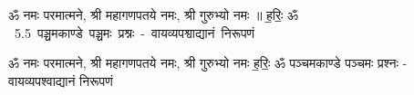 \documentclass[17pt]{extarticle}
\begin{document}
\begin{titlepage}
    \begin{center}
 
\begin{sanskrit}
    { \Large
    ॐ नमः परमात्मने, श्री महागणपतये नमः, श्री गुरुभ्यो नमः ॥ ह॒रिः॒ ॐ 
    }
    \\
    \vspace{2.5cm}
    \mbox{ \Huge
    5.5      पञ्चमकाण्डे पञ्चमः प्रश्नः - वायव्यपश्वाद्यानं निरूपणं   }
\end{sanskrit}
\end{center}

\end{titlepage}
\tableofcontents

ॐ नमः परमात्मने, श्री महागणपतये नमः, श्री गुरुभ्यो नमः
ह॒रिः॒ ॐ       पञ्चमकाण्डे पञ्चमः प्रश्नः - वायव्यपश्वाद्यानं निरूपणं \newline

\end{document}
